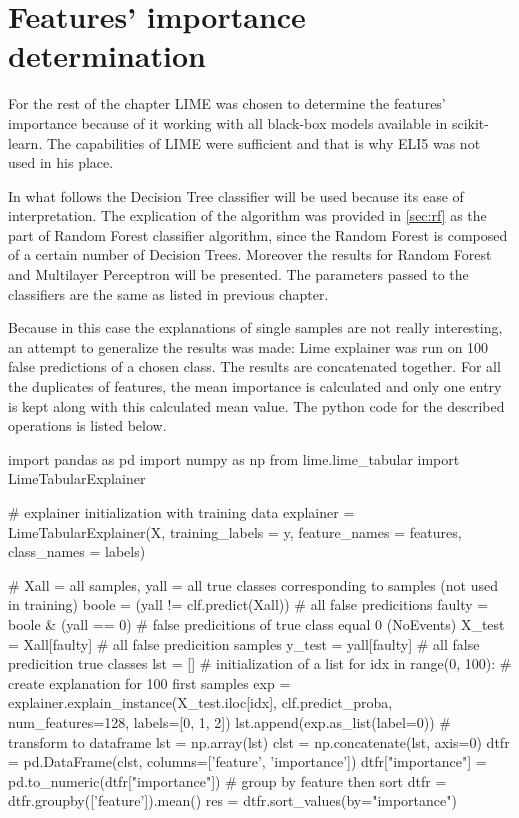 \section{Features' importance determination}
For the rest of the chapter LIME was chosen to determine the features' importance because of it working with all black-box models available in scikit-learn. The capabilities of LIME were sufficient and that is why ELI5 was not used in his place.

In what follows the Decision Tree classifier will be used because its ease of interpretation. The explication of the algorithm was provided in \ref{sec:rf} as the part of Random Forest classifier algorithm, since the Random Forest is composed of a certain number of Decision Trees. Moreover the results for Random Forest and Multilayer Perceptron will be presented. The parameters passed to the classifiers are the same as listed in previous chapter.

Because in this case the explanations of single samples are not really interesting, an attempt to generalize the results was made: Lime explainer was run on 100 false predictions of a chosen class. The results are concatenated together. For all the duplicates of features, the mean importance is calculated and only one entry is kept along with this calculated mean value. The python code for the described operations is listed below.

\begin{python}
import pandas as pd
import numpy as np
from lime.lime_tabular import LimeTabularExplainer

# explainer initialization with training data
explainer = LimeTabularExplainer(X, training_labels = y, feature_names = features, class_names = labels)

# Xall = all samples, yall = all true classes corresponding to samples (not used in training)
boole = (yall != clf.predict(Xall)) # all false predicitions
faulty = boole & (yall == 0) # false predicitions of true class equal 0 (NoEvents)
X_test = Xall[faulty] # all false predicition samples
y_test = yall[faulty] # all false predicition true classes
lst = [] # initialization of a list
for idx in range(0, 100): # create explanation for 100 first samples
    exp = explainer.explain_instance(X_test.iloc[idx], clf.predict_proba, num_features=128, labels=[0, 1, 2])
    lst.append(exp.as_list(label=0))
# transform to dataframe
lst = np.array(lst)
clst = np.concatenate(lst, axis=0)
dtfr = pd.DataFrame(clst, columns=['feature', 'importance'])
dtfr["importance"] = pd.to_numeric(dtfr["importance"])
# group by feature then sort
dtfr = dtfr.groupby(['feature']).mean()
res = dtfr.sort_values(by="importance")
\end{python}

